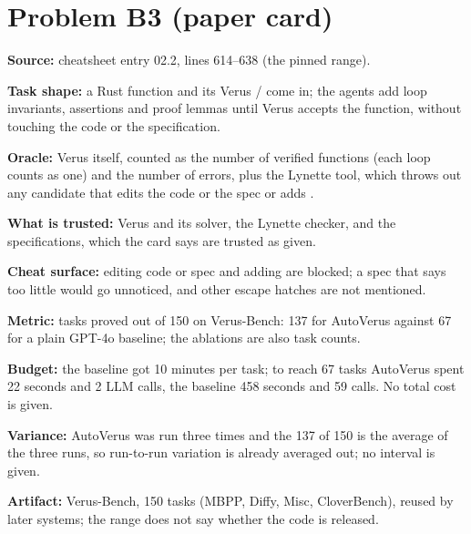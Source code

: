 \documentclass[11pt]{article}
\begin{document}
\section*{Problem B3 (paper card)}\label{ans:B3}
\begin{answer}
\textbf{Source:} cheatsheet entry 02.2, lines 614--638 (the pinned range).

\textbf{Task shape:} a Rust function and its Verus /
come in; the agents add loop invariants, assertions and proof lemmas until
Verus accepts the function, without touching the code or the specification.

\textbf{Oracle:} Verus itself, counted as the number of verified functions
(each loop counts as one) and the number of errors, plus the Lynette tool,
which throws out any candidate that edits the code or the spec or adds
.

\textbf{What is trusted:} Verus and its solver, the Lynette checker, and the
specifications, which the card says are trusted as given.

\textbf{Cheat surface:} editing code or spec and adding  are
blocked; a spec that says too little would go unnoticed, and other escape
hatches are not mentioned.

\textbf{Metric:} tasks proved out of 150 on Verus-Bench: 137 for AutoVerus
against 67 for a plain GPT-4o baseline; the ablations are also task counts.

\textbf{Budget:} the baseline got 10 minutes per task; to reach 67 tasks
AutoVerus spent 22 seconds and 2 LLM calls, the baseline 458 seconds and 59
calls. No total cost is given.

\textbf{Variance:} AutoVerus was run three times and the 137 of 150 is the
average of the three runs, so run-to-run variation is already averaged out;
no interval is given.

\textbf{Artifact:} Verus-Bench, 150 tasks (MBPP, Diffy, Misc, CloverBench),
reused by later systems; the range does not say whether the code is released.
\end{answer}
\end{document}

